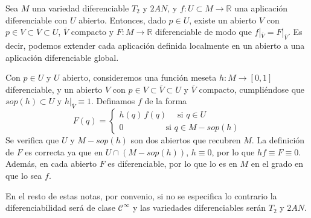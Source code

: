 \begin{teo}
Sea $M$ una variedad diferenciable $T_2$ y $2AN$, y $f: U\subset M \to \mathbb{R}$ una aplicación diferenciable con $U$ abierto. Entonces, dado $p \in U$, existe un abierto $V$ con $p \in V \subset \overline{V} \subset U$, $\overline{V}$ compacto y $F: M \to \mathbb{R}$ diferenciable de modo que $f|_{\overline{V}} = F|_{\overline{V}}$. Es decir, podemos extender cada aplicación definida localmente en un abierto a una aplicación diferenciable global.
\end{teo}
\begin{dem}
Con $p \in U$ y $U$ abierto, consideremos una función meseta $h: M\to [0,1]$ diferenciable, y un abierto $V$ con $p \in V \subset \overline{V} \subset U$ y $\overline{V}$ compacto, cumpliéndose que $sop(h) \subset U$ y $h|_{\overline{V}}\equiv 1$. Definamos $f$ de la forma $$F(q) = \begin{cases}
h(q) \, f(q) \quad \;\text{si } q \in U\\
0 \qquad \qquad \quad \text{si } q \in M - sop(h)
\end{cases}$$
Se verifica que $U$ y $M - sop(h)$ son dos abiertos que recubren $M$. La definición de $F$ es correcta ya que en $U \cap (M - sop(h))$, $h \equiv 0$, por lo que $hf \equiv F \equiv 0$. Además, en cada abierto $F$ es diferenciable, por lo que lo es en $M$ en el grado en que lo sea $f$.
\end{dem} 

\begin{obs}
En el resto de estas notas, por convenio, si no se especifica lo contrario la diferenciabilidad será de clase $\mathcal{C}^{\infty}$ y las variedades diferenciables serán $T_2$ y $2AN$.
\end{obs}


